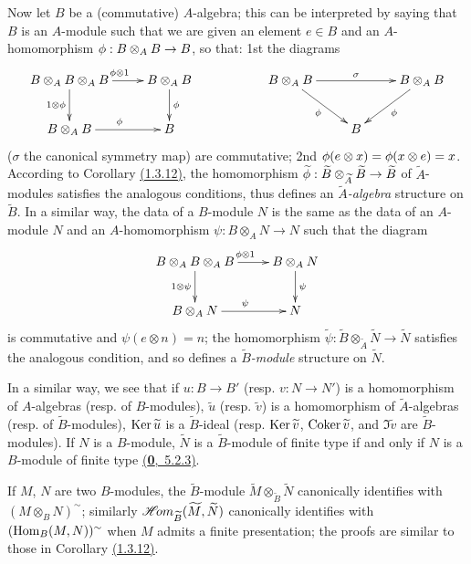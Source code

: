\begin{env}[1.3.13]
\label{env-1.1.3.13}
Now let $B$ be a (commutative) $A$-algebra; this can be interpreted by saying that $B$ is an
$A$-module such that we are given an element $e\in B$ and an $A$-homomorphism
$\phi:B\otimes_A B\to B$, so that: 1st the diagrams
\[
  \xymatrix{
    B\otimes_A B\otimes_A B\ar[r]^{\vphi\otimes 1}\ar[d]_{1\otimes\vphi} &
    B\otimes_A B\ar[d]^\vphi & &
    B\otimes_A B\ar[rr]^\sigma\ar[rd]_\vphi & &
    B\otimes_A B\ar[dl]^\vphi\\
    B\otimes_A B\ar[r]^\vphi &
    B & & &
    B
  }
\]
($\sigma$ the canonical symmetry map) are commutative; 2nd
$\phi(e\otimes x)=\phi(x\otimes e)=x$. According to
Corollary \hyperref[cor-1.1.3.12]{(1.3.12)}, the homomorphism
$\widetilde{\phi}:\widetilde{B}\otimes_{\widetilde{A}}\widetilde{B}\to\widetilde{B}$ of
$\widetilde{A}$-modules satisfies the analogous conditions, thus defines an
{\it $\widetilde{A}$-algebra} structure on $\widetilde{B}$. In a similar way, the data of
a $B$-module $N$ is the same as the data of an $A$-module $N$ and an $A$-homomorphism
$\psi:B\otimes_A N\to N$ such that the diagram
\[
  \xymatrix{
    B\otimes_A B\otimes_A B\ar[r]^{\vphi\otimes 1}\ar[d]_{1\otimes\psi} &
    B\otimes_A N\ar[d]^\psi\\
    B\otimes_A N\ar[r]^\psi &
    N
  }
\]
is commutative and $\psi(e\otimes n)=n$; the homomorphism
$\widetilde{\psi}:\widetilde{B}\otimes_{\widetilde{A}}\widetilde{N}\to\widetilde{N}$
satisfies the analogous condition, and so defines a {\it $\widetilde{B}$-module} structure
on $\widetilde{N}$.

In a similar way, we see that if $u:B\to B'$ (resp. $v:N\to N'$) is a homomorphism of
$A$-algebras (resp. of $B$-modules), $\widetilde{u}$ (resp. $\widetilde{v}$) is a
homomorphism of $\widetilde{A}$-algebras (resp. of $\widetilde{B}$-modules),
${\mathop{\mathrm{Ker}}\nolimits}\,\widetilde{u}$ is a $\widetilde{B}$-ideal (resp. ${\mathop{\mathrm{Ker}}\nolimits}\,\widetilde{v}$,
${\mathop{\mathrm{Coker}}\nolimits}\,\widetilde{v}$, and $\Im\widetilde{v}$ are $\widetilde{B}$-modules). If $N$ is a
$B$-module, $\widetilde{N}$ is a $\widetilde{B}$-module of finite type if and only if $N$
is a $B$-module of finite type \hyperref[env-0.5.2.3]{(\textbf{0},~5.2.3)}.

If $M$, $N$ are two $B$-modules, the $\widetilde{B}$-module
$\widetilde{M}\otimes_{\widetilde{B}}\widetilde{N}$ canonically identifies with
$(M\otimes_B N)^\sim$; similarly $\mathscr{H}\!{om}_{\widetilde{B}}(\widetilde{M},\widetilde{N})$
canonically identifies with $({\mathop{\mathrm{Hom}}\nolimits}_B(M,N))^\sim$ when $M$ admits a finite presentation; the
proofs are similar to those in Corollary \hyperref[cor-1.1.3.12]{(1.3.12)}.


\end{env}
